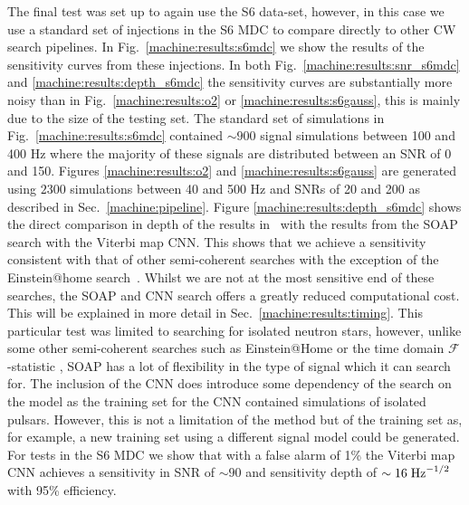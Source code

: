 %
The final test was set up to again use the S6 data-set, however, in this case
we use a standard set of injections in the S6
\gls{MDC} \citep{walsh2016ComparisonMethods} to compare directly to other \gls{CW}
search pipelines. In Fig.~\ref{machine:results:s6mdc} we show the results of the
sensitivity curves from these injections. 
In both Fig.~\ref{machine:results:snr_s6mdc} and \ref{machine:results:depth_s6mdc} the sensitivity curves are substantially more noisy than in Fig.~\ref{machine:results:o2} or \ref{machine:results:s6gauss}, this is mainly due to the size of the testing set.
The standard set of simulations in Fig.~\ref{machine:results:s6mdc} contained $\sim 900$ signal simulations between 100 and 400 Hz where the majority of these signals are distributed between an \gls{SNR} of 0 and 150. 
Figures \ref{machine:results:o2} and \ref{machine:results:s6gauss} are generated using $2300$ simulations between 40 and 500 Hz and \glspl{SNR} of 20 and 200 as described in Sec.~\ref{machine:pipeline}.
Figure \ref{machine:results:depth_s6mdc} shows the direct comparison in depth of the
results in~\citep{walsh2016ComparisonMethods} with the results from the SOAP
search with the Viterbi map \gls{CNN}. This shows that we achieve a sensitivity
consistent with that of other semi-coherent searches with the
exception of the Einstein@home search~\citep{abbott2016ResultsDeepest}. Whilst
we are not at the most sensitive end of these searches, the SOAP and \gls{CNN}
search offers a greatly reduced computational cost. This will be explained in more detail in
Sec.~\ref{machine:results:timing}. This particular test was limited to searching for
isolated neutron stars, however, unlike some other semi-coherent searches such as Einstein@Home \citep{singh2016ResultsAllsky} or the time domain $\mathcal{F}$-statistic \citep{aasi2014ImplementationTextdollar}, SOAP has a lot of flexibility in the type of signal which it can search for.
The inclusion of the \gls{CNN} does introduce some dependency of the search
on the model as the training set for the \gls{CNN} contained simulations of isolated pulsars. 
However, this is not a limitation of the method but of the training set as, for example, a new training set using a different signal model could be generated. 
For tests in the S6 \gls{MDC} we show that with a false alarm of 1\% the Viterbi map
\gls{CNN} achieves a sensitivity in SNR of $\sim 90$ and sensitivity depth of
$\sim 16\;{\rm Hz}^{-1/2}$ with 95\% efficiency.


